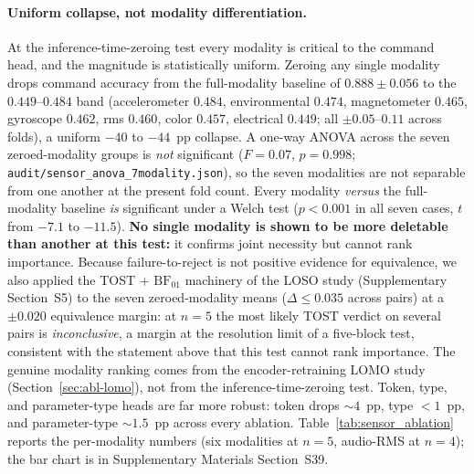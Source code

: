 \documentclass[sensors,article,submit,moreauthors,pdftex]{Definitions/mdpi}
\begin{document}
\paragraph{Uniform collapse, not modality differentiation.} At the inference-time-zeroing test every modality is critical to the command head, and the magnitude is statistically uniform. Zeroing any single modality drops command accuracy from the full-modality baseline of $0.888 \pm 0.056$ to the $0.449$--$0.484$ band (accelerometer $0.484$, environmental $0.474$, magnetometer $0.465$, gyroscope $0.462$, rms $0.460$, color $0.457$, electrical $0.449$; all $\pm 0.05$--$0.11$ across folds), a uniform $-40$ to $-44$~pp collapse. A one-way ANOVA across the seven zeroed-modality groups is \emph{not} significant ($F=0.07$, $p=0.998$; \texttt{audit/sensor\_anova\_7modality.json}), so the seven modalities are not separable from one another at the present fold count. Every modality \emph{versus} the full-modality baseline \emph{is} significant under a Welch test ($p<0.001$ in all seven cases, $t$ from $-7.1$ to $-11.5$). \textbf{No single modality is shown to be more deletable than another at this test:} it confirms joint necessity but cannot rank importance. Because failure-to-reject is not positive evidence for equivalence, we also applied the TOST + $\mathrm{BF}_{01}$ machinery of the LOSO study (Supplementary Section~S5) to the seven zeroed-modality means ($\Delta\!\le\!0.035$ across pairs) at a $\pm 0.020$ equivalence margin: at $n\!=\!5$ the most likely TOST verdict on several pairs is \emph{inconclusive}, a margin at the resolution limit of a five-block test, consistent with the statement above that this test cannot rank importance. The genuine modality ranking comes from the encoder-retraining LOMO study (Section~\ref{sec:abl-lomo}), not from the inference-time-zeroing test. Token, type, and parameter-type heads are far more robust: token drops $\sim 4$~pp, type $<1$~pp, and parameter-type $\sim 1.5$~pp across every ablation. Table~\ref{tab:sensor_ablation} reports the per-modality numbers (six modalities at $n\!=\!5$, audio-RMS at $n\!=\!4$); the bar chart is in Supplementary Materials Section~S39.


\end{document}
